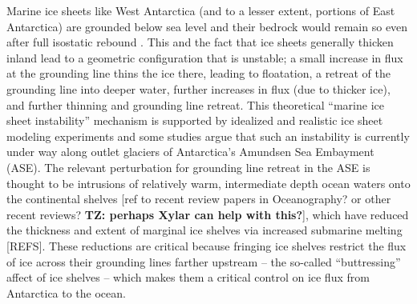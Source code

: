 \documentclass[review,oneside]{igs}
\begin{document}
Marine ice sheets like West Antarctica (and to a lesser extent, portions of East Antarctica) are grounded below sea level and their bedrock would remain so even after full isostatic rebound \citep{barletta2018}. This and the fact that ice sheets generally thicken inland lead to a geometric configuration that is unstable; a small increase in flux at the grounding line thins the ice there, leading to floatation, a retreat of the grounding line into deeper water, further increases in flux (due to thicker ice), and further thinning and grounding line retreat. This theoretical ``marine ice sheet instability'' mechanism \citep{mercer1978, schoof2007} is supported by idealized \citep{schoof2012, asay2016} and realistic ice sheet modeling \citep{royston2016} experiments and some studies \citep{joughin2014,rignot2014} argue that such an instability is currently under way along outlet glaciers of Antarctica's Amundsen Sea Embayment (ASE). The relevant perturbation for grounding line retreat in the ASE is thought to be intrusions of relatively warm, intermediate depth ocean waters onto the continental shelves [ref to recent review papers in Oceanography? or other recent reviews? {\bf{TZ: perhaps Xylar can help with this?}}], which have reduced the thickness and extent of marginal ice shelves via increased submarine melting [REFS]. These reductions are critical because fringing ice shelves restrict the flux of ice across their grounding lines farther upstream -- the so-called ``buttressing'' affect of ice shelves \citep{gudmundsson2012, gudmundsson2013, derydt2015} -- which makes them a critical control on ice flux from Antarctica to the ocean.

\end{document}
